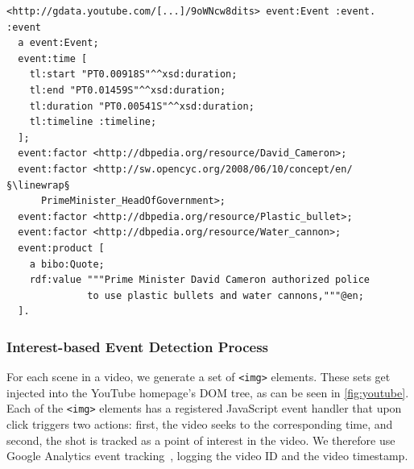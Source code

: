 \documentclass[runningheads,a4paper]{llncs}
\newcommand{\linewrap}{\raisebox{-.6ex}{\textcolor{grey}{$\hookleftarrow$}}}
\begin{document}
\begin{lstlisting}[caption=Exemplary extracted named entities from a YouTube video on the London riots., label=code:semwebvid, float=htb!, escapechar=§]
<http://gdata.youtube.com/[...]/9oWNcw8dits> event:Event :event.
:event
  a event:Event;
  event:time [
    tl:start "PT0.00918S"^^xsd:duration;
    tl:end "PT0.01459S"^^xsd:duration;
    tl:duration "PT0.00541S"^^xsd:duration;
    tl:timeline :timeline;
  ];
  event:factor <http://dbpedia.org/resource/David_Cameron>;
  event:factor <http://sw.opencyc.org/2008/06/10/concept/en/§\linewrap§
      PrimeMinister_HeadOfGovernment>;
  event:factor <http://dbpedia.org/resource/Plastic_bullet>;
  event:factor <http://dbpedia.org/resource/Water_cannon>;
  event:product [
    a bibo:Quote;
    rdf:value """Prime Minister David Cameron authorized police
              to use plastic bullets and water cannons,"""@en;
  ].
\end{lstlisting} 

\subsubsection{Interest-based Event Detection Process}
For each scene in a video, we generate a set of \texttt{<img>} elements. These sets get injected into the YouTube homepage's DOM tree, as can be seen in \autoref{fig:youtube}. Each of the \texttt{<img>} elements has a registered JavaScript event handler that upon click triggers two actions: first, the video seeks to the corresponding time, and second, the shot is tracked as a point of interest in the video. We therefore use Google Analytics event tracking~\cite{analyticsevent}, logging the video ID and the video timestamp.
\end{document}
